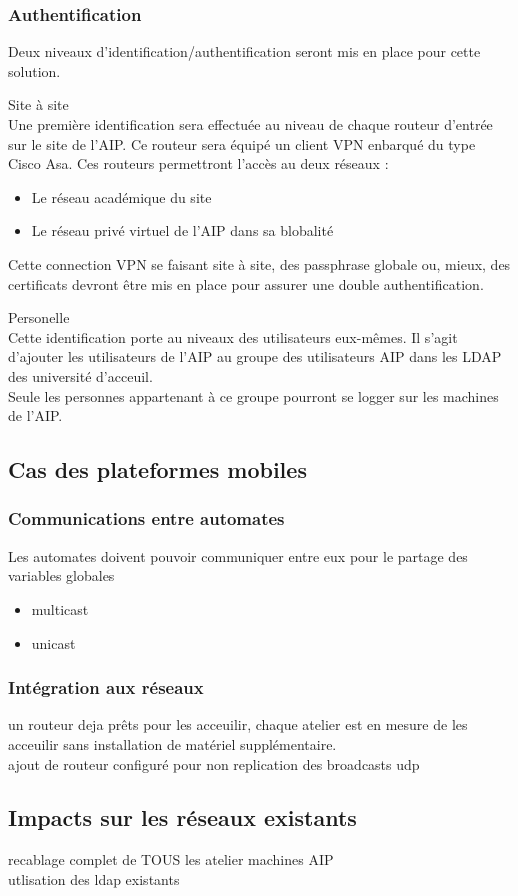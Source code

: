 \subsubsection{Authentification}
Deux niveaux d'identification/authentification seront mis en place pour cette solution.
\begin{description}
\item{Site à site} \\
Une première identification sera effectuée au niveau de chaque routeur d'entrée sur le site de l'AIP. Ce routeur sera équipé un client VPN enbarqué du type Cisco Asa. Ces routeurs permettront l'accès au deux réseaux : 
\begin{itemize}
\item Le réseau académique du site
\item Le réseau privé virtuel de l'AIP dans sa blobalité
\end{itemize}
Cette connection VPN se faisant site à site, des passphrase globale ou, mieux, des certificats devront être mis en place pour assurer une double authentification.

\item{Personelle} \\
Cette identification porte au niveaux des utilisateurs eux-mêmes. Il s'agit d'ajouter les utilisateurs de l'AIP au groupe des utilisateurs AIP dans les LDAP des université d'acceuil.\\
Seule les personnes appartenant à ce groupe pourront se logger sur les machines de l'AIP.

\end{description}

\subsection{Cas des plateformes mobiles}
\subsubsection{Communications entre automates}
Les automates doivent pouvoir communiquer entre eux pour le partage des variables globales

\begin{itemize}
	\item multicast
	\item unicast
\end{itemize}

\subsubsection{Intégration aux réseaux}
un routeur deja prêts pour les acceuilir, chaque atelier est en mesure de les acceuilir sans installation de matériel supplémentaire.\\
 ajout de routeur configuré pour non replication des broadcasts udp\\


\subsection{Impacts sur les réseaux existants}
recablage complet de TOUS les atelier machines AIP\\
utlisation des ldap existants


